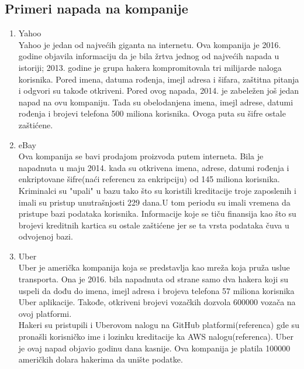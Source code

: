 \documentclass[a4paper]{article}
\begin{document}
{\begin{enumerate}
\end{enumerate}


\subsection{Primeri napada na kompanije}
\label{subsec:primeri_napada_kompanije}


\begin{enumerate}
\item Yahoo
\\Yahoo je jedan od najvećih giganta na internetu. Ova kompanija je 2016. godine objavila informaciju da je bila žrtva jednog od najvećih napada u istoriji; 2013. godine je grupa hakera kompromitovala tri milijarde naloga korisnika. Pored imena, datuma rođenja, imejl adresa i šifara, zaštitna pitanja i odgvori su takođe otkriveni. 
Pored ovog napada, 2014. je zabeležen još jedan napad na ovu kompaniju. Tada su obelodanjena imena, imejl adrese, datumi rođenja i brojevi telefona 500 miliona korisnika. Ovoga puta su šifre ostale zaštićene.\\ 
\item eBay
\\Ova kompanija se bavi prodajom proizvoda putem interneta. Bila je napadnuta u maju 2014. kada su otkrivena imena, adrese, datumi rođenja i enkriptovane šifre(naći referencu za enkripciju) od 145 miliona korisnika. Kriminalci su "upali" u bazu tako što su koristili kreditacije troje zaposlenih i imali su pristup unutrašnjosti 229 dana.U tom periodu su imali vremena da pristupe bazi podataka korisnika. Informacije koje se tiču finansija kao što su brojevi kreditnih kartica su ostale zaštićene jer se ta vrsta podataka čuva u odvojenoj bazi.\\
\item Uber
\\Uber je američka kompanija koja se predstavlja kao mreža koja pruža uslue transporta. Ona je 2016. bila napadnuta od strane samo dva hakera koji su uspeli da dođu do imena, imejl adresa i brojeva telefona 57 miliona korisnika Uber aplikacije. Takođe, otkriveni brojevi vozačkih dozvola 600000 vozača na ovoj platformi.\\Hakeri su pristupili i Uberovom nalogu na GitHub platformi(referenca) gde su pronašli korisničko ime i lozinku kreditacije ka AWS nalogu(referenca). 
Uber je ovaj napad objavio godinu dana kasnije. Ova kompanija je platila 100000 američkih dolara hakerima da unište podatke.  
\end{enumerate}


}
\end{document}
